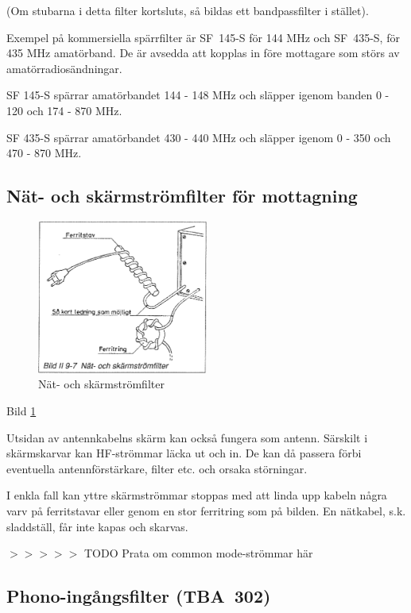 (Om stubarna i detta filter kortsluts, så bildas ett bandpassfilter i
stället).

Exempel på kommersiella spärrfilter är SF~145-S för 144 MHz och
SF~435-S, för 435 MHz amatörband. De är avsedda att kopplas in före
mottagare som störs av amatörradiosändningar.

SF 145-S spärrar amatörbandet 144 - 148 MHz och släpper igenom banden
0 - 120 och 174 - 870 MHz.

SF 435-S spärrar amatörbandet 430 - 440 MHz och släpper igenom 0 -
350 och 470 - 870 MHz.

\subsection{Nät- och skärmströmfilter för mottagning}

\begin{figure}
  \includegraphics[width=0.5\textwidth]{images/bild_2_9-07}
  \caption{Nät- och skärmströmfilter}
  \label{fig:bildII9-7}
\end{figure}

Bild \ref{fig:bildII9-7}

\begin{rev-omarbetas}
Utsidan av antennkabelns skärm kan också fungera som antenn. Särskilt
i skärmskarvar kan HF-strömmar läcka ut och in. De kan då passera förbi
eventuella antennförstärkare, filter etc. och orsaka störningar.

I enkla fall kan yttre skärmströmmar stoppas med att linda upp kabeln
några varv på ferritstavar eller genom en stor ferritring som på
bilden. En nätkabel, s.k. sladdställ, får inte kapas och skarvas.

$>>>>>$ TODO Prata om common mode-strömmar här
\end{rev-omarbetas}

\subsection{Phono-ingångsfilter (TBA~302)}

